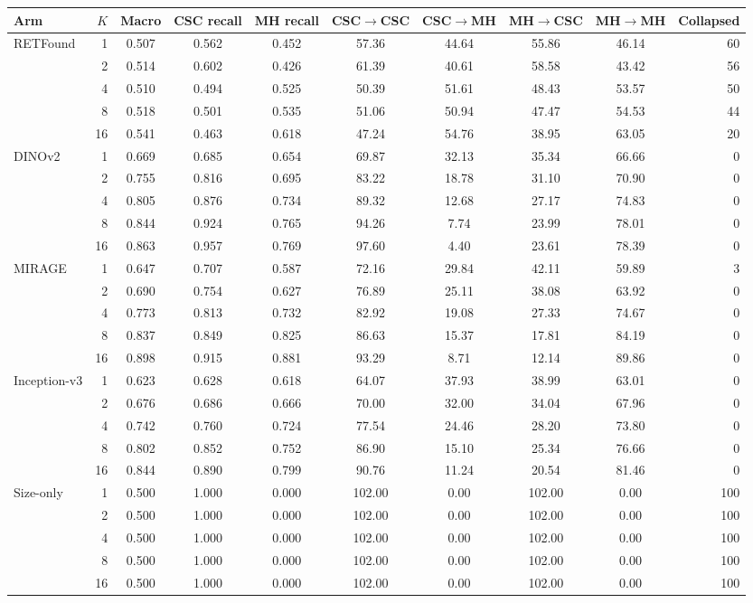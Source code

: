 \begin{tabular}{@{}lrcccccccr@{}}
\toprule
Arm & $K$ & Macro & CSC recall & MH recall & CSC$\to$CSC & CSC$\to$MH & MH$\to$CSC & MH$\to$MH & Collapsed \\
\midrule
RETFound & 1 & 0.507 & 0.562 & 0.452 & 57.36 & 44.64 & 55.86 & 46.14 & 60 \\
 & 2 & 0.514 & 0.602 & 0.426 & 61.39 & 40.61 & 58.58 & 43.42 & 56 \\
 & 4 & 0.510 & 0.494 & 0.525 & 50.39 & 51.61 & 48.43 & 53.57 & 50 \\
 & 8 & 0.518 & 0.501 & 0.535 & 51.06 & 50.94 & 47.47 & 54.53 & 44 \\
 & 16 & 0.541 & 0.463 & 0.618 & 47.24 & 54.76 & 38.95 & 63.05 & 20 \\
\addlinespace[2pt]
DINOv2 & 1 & 0.669 & 0.685 & 0.654 & 69.87 & 32.13 & 35.34 & 66.66 & 0 \\
 & 2 & 0.755 & 0.816 & 0.695 & 83.22 & 18.78 & 31.10 & 70.90 & 0 \\
 & 4 & 0.805 & 0.876 & 0.734 & 89.32 & 12.68 & 27.17 & 74.83 & 0 \\
 & 8 & 0.844 & 0.924 & 0.765 & 94.26 & 7.74 & 23.99 & 78.01 & 0 \\
 & 16 & 0.863 & 0.957 & 0.769 & 97.60 & 4.40 & 23.61 & 78.39 & 0 \\
\addlinespace[2pt]
MIRAGE & 1 & 0.647 & 0.707 & 0.587 & 72.16 & 29.84 & 42.11 & 59.89 & 3 \\
 & 2 & 0.690 & 0.754 & 0.627 & 76.89 & 25.11 & 38.08 & 63.92 & 0 \\
 & 4 & 0.773 & 0.813 & 0.732 & 82.92 & 19.08 & 27.33 & 74.67 & 0 \\
 & 8 & 0.837 & 0.849 & 0.825 & 86.63 & 15.37 & 17.81 & 84.19 & 0 \\
 & 16 & 0.898 & 0.915 & 0.881 & 93.29 & 8.71 & 12.14 & 89.86 & 0 \\
\addlinespace[2pt]
Inception-v3 & 1 & 0.623 & 0.628 & 0.618 & 64.07 & 37.93 & 38.99 & 63.01 & 0 \\
 & 2 & 0.676 & 0.686 & 0.666 & 70.00 & 32.00 & 34.04 & 67.96 & 0 \\
 & 4 & 0.742 & 0.760 & 0.724 & 77.54 & 24.46 & 28.20 & 73.80 & 0 \\
 & 8 & 0.802 & 0.852 & 0.752 & 86.90 & 15.10 & 25.34 & 76.66 & 0 \\
 & 16 & 0.844 & 0.890 & 0.799 & 90.76 & 11.24 & 20.54 & 81.46 & 0 \\
\addlinespace[2pt]
Size-only & 1 & 0.500 & 1.000 & 0.000 & 102.00 & 0.00 & 102.00 & 0.00 & 100 \\
 & 2 & 0.500 & 1.000 & 0.000 & 102.00 & 0.00 & 102.00 & 0.00 & 100 \\
 & 4 & 0.500 & 1.000 & 0.000 & 102.00 & 0.00 & 102.00 & 0.00 & 100 \\
 & 8 & 0.500 & 1.000 & 0.000 & 102.00 & 0.00 & 102.00 & 0.00 & 100 \\
 & 16 & 0.500 & 1.000 & 0.000 & 102.00 & 0.00 & 102.00 & 0.00 & 100 \\
\bottomrule
\end{tabular}
